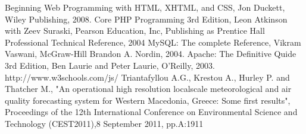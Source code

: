 \documentclass[conference]{IEEEtran}
\begin{document}
\begin{thebibliography}{1}
 Beginning Web Programming with HTML, XHTML, and CSS, Jon Duckett, Wiley Publishing, 2008.
Core PHP Programming 3rd Edition, Leon Atkinson with Zeev Suraski, Pearson Education, Inc,  Publishing as Prentice Hall Professional Technical Reference, 2004 
 MySQL: The complete Reference, Vikram Vaswani, McGraw-Hill \- Brandon A. Nordin, 2004.
 Apache: The Definitive Quide 3rd Edition, Ben Laurie and Peter Laurie, O'Reilly, 2003. 
 http://www.w3schools.com/js/
Triantafyllou A.G., Krestou A., Hurley P. and Thatcher M., "An operational  high resolution local\-scale meteorological and air quality forecasting system   for Western Macedonia, Greece: Some first results", Proceedings of the 12th International Conference on Environmental Science and Technology (CEST2011),8 September 2011, pp.A:1911


\end{thebibliography}
\end{document}
